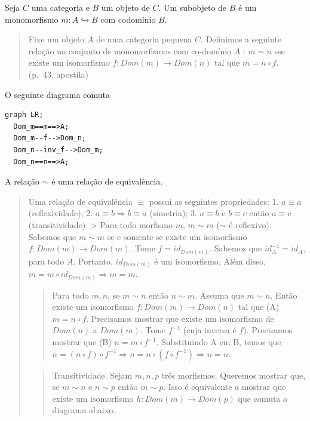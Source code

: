 Seja \(C\) uma categoria e \(B\) um objeto de \(C\). Um subobjeto de
\(B\) é um monomorfismo \(m : A \hookrightarrow B\) com codomínio \(B\).

\begin{quote}
Fixe um objeto \(A\) de uma categoria pequena \(C\). Definimos a
seguinte relação no conjunto de monomorfismos com co-domínio \(A\) :
\(m \sim n\) sse existe um isomorfismo \(f : Dom(m) \rightarrow Dom(n)\)
tal que \(m = n \circ f\). (p.~43, apostila)
\end{quote}

O seguinte diagrama comuta

\begin{verbatim}
graph LR;
  Dom_m==m==>A; 
  Dom_m--f-->Dom_n;
  Dom_n--inv_f-->Dom_m;
  Dom_n==n==>A;
\end{verbatim}

A relação \(\sim\) é uma relação de equivalência.

\begin{quote}
Uma relação de equivalência \(\equiv\) possui as seguintes propriedades:
1. \(a \equiv a\) (reflexividade); 2.
\(a \equiv b \Rightarrow b \equiv a\) (simetria); 3. \(a \equiv b\) e
\(b \equiv c\) então \(a \equiv c\) (transitividade). \textgreater{}
Para todo morfismo \(m\), \(m \sim m\) (\(\sim\) é reflexivo). Sabemos
que \(m \sim m\) se e somente se existe um isomorfismo
\(f : Dom(m) \rightarrow Dom (m)\). Tome \(f = id_{Dom(m)}\). Sabemos
que \(id_A^{-1} = id_A\), para todo \(A\). Portanto, \(id_{Dom(m)}\) é
um isomorfismo. Além disso,
\(m = m \circ id_{Dom(m)} \Rightarrow m = m\).

\begin{quote}
Para todo \(m , n\), se \(m \sim n\) então \(n \sim m\). Assuma que
\(m \sim n\). Então existe um isomorfismo
\(f : Dom(m) \rightarrow Dom(n)\) tal que (A) \(m = n \circ f\).
Precisamos mostrar que existe um isomorfismo de \(Dom(n)\) a \(Dom(m)\).
Tome \(f^{-1}\) (cuja inversa é \(f\)). Precisamos mostrar que (B)
\(n = m \circ f^{-1}\). Substituindo A em B, temos que
\(n = (n \circ f) \circ f^{-1} \Rightarrow n = n \circ (f \circ f^{-1}) \Rightarrow n = n\).
\end{quote}

\begin{quote}
Transitividade. Sejam \(m, n, p\) três morfismos. Queremos mostrar que,
se \(m \sim n\) e \(n \sim p\) então \(m \sim p\). Isso é equivalente a
mostrar que existe um isomorfismo \(h: Dom(m) \rightarrow Dom(p)\) que
comuta o diagrama abaixo.
\end{quote}
\end{quote}

